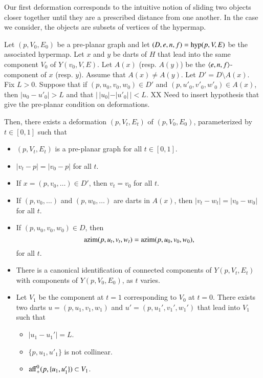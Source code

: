 Our first deformation corresponds to the intuitive
notion of sliding two objects closer together until
they are a prescribed distance from one another.
In the case we consider, the objects are subsets of
vertices of the hypermap.

\begin{lemma} Let $(p,V_0,E_0)$ be a pre-planar graph and
let $(D,e,n,f)={\operatorname{hyp}}(p,V,E)$ be the associated hypermap.
Let $x$ and $y$ be darts of $H$ that lead into the same
component $V_0$ of $Y(v_0,V,E)$.  Let $A(x)$ (resp. $A(y)$)
be the $\langle e,n,f\rangle$-component of $x$ (resp. $y$).
Assume that $A(x)\ne A(y)$.
Let $D' = D\setminus A(x)$.  
Fix $L>0$.
Suppose that if $(p,u_0,v_0,w_0)\in D'$ and
$(p,u'_0,v'_0,w'_0)\in A(x)$, then $|u_0-u'_0|>L$ and
that $|\,|u_0| - |u'_0|\,| < L$.
XX Need to insert hypothesis that give the pre-planar condition
on deformations.

Then, there exists a deformation
$(p,V_t,E_t)$ of $(p,V_0,E_0)$, parameterized by $t\in[0,1]$ such
that
\begin{itemize}
\item $(p,V_t,E_t)$ is a pre-planar graph for all $t\in[0,1]$.
\item $|v_t-p| = |v_0-p|$ for all $t$.
\item If $x=(p,v_0,\ldots)\in D'$, then $v_t=v_0$ for all $t$.
\item If $(p,v_0,\ldots)$ and $(p,w_0,\ldots)$ are darts
in $A(x)$, then $|v_t-w_t|=|v_0-w_0|$ for all $t$.
\item If $(p,u_0,v_0,w_0)\in D$, then 
   $$
   {\operatorname{azim}}(p,u_t,v_t,w_t) = {\operatorname{azim}}(p,u_0,v_0,w_0),
   $$
   for all $t$.
\item There is a canonical identification of connected components
of $Y(p,V_t,E_t)$ with components of $Y(p,V_0,E_0)$, as $t$ varies.
\item 
Let $V_1$ be the component at $t=1$ corresponding to $V_0$ at $t=0$.
There exists two darts $u=(p,u_1,v_1,w_1)$ and
$u'=(p,u_1',v_1',w_1')$ that lead into $V_1$ such that
  \begin{itemize} %
  \item $|u_1-u_1'| = L$.
  \item $\{p,u_1,u'_1\}$ is not collinear.
  \item ${\operatorname{aff}}_+^0(p,\{u_1,u_1'\}) \subset V_1$.
  \end{itemize} %
\end{itemize}
\end{lemma}

